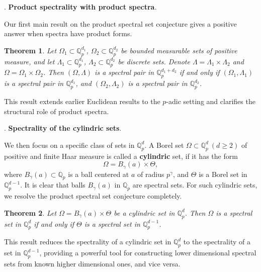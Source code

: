 \documentclass[a4paper,12pt]{amsart}
\newtheorem{theorem}{Theorem}[section]
\def\Q{\mathbb{Q}}
\def\Qp{\mathbb{Q}_p}
\begin{document}
. {\bf Product spectrality with product spectra}.

Our first main result on the product spectral set conjecture gives a positive answer when spectra have product forms.

\begin{theorem}\label{product}
Let $\Omega_1\subset\Q_p^{d_1}$, $\Omega_2\subset\Q_p^{d_2}$ be bounded  measurable sets of positive measure,
and let $\Lambda_1\subset\Q_p^{d_1}$, $\Lambda_2\subset\Q_p^{d_2}$ be  discrete sets.
Denote $\Lambda=\Lambda_1\times\Lambda_2$ and $\Omega=\Omega_1\times\Omega_2$.
Then $(\Omega,\Lambda)$ is a spectral pair in $\Q_p^{d_1+d_2}$ if and only if $(\Omega_1,\Lambda_1)$
is a spectral pair in $\Q_p^{d_1}$, and $(\Omega_2,\Lambda_2)$ is a spectral pair in $\Q_p^{d_2}$.
\end{theorem}

This result extends earlier Euclidean results \cite{Jorgensen-Pedersen1999} to the $p$-adic
setting and clarifies the structural role of product spectra.

. {\bf Spectrality of the cylindric sets}.

We then focus on a specific class of sets in $\Q_p^d$. A Borel set
 $\Omega\subset\Q_p^d \ (d\geq2)$  of positive and finite Haar measure is called
a \textbf{cylindric} set, if it has the form
 \begin{equation}
 \Omega=B_\gamma(a)\times\Theta,
\end{equation}
where $B_\gamma(a)\subset\Q_p$ is a ball centered at $a$ of radius $p^\gamma$,
and $\Theta$ is a Borel set in $\Q_p^{d-1}$. It is clear that balls $B_\gamma(a)$ in
$\Q_p$ are spectral sets.
For such cylindric sets, we resolve the product spectral set conjecture completely.
\begin{theorem}\label{main}
Let $\Omega=B_\gamma(a)\times\Theta$ be a cylindric set in $\Qp^d$. Then $\Omega$ is a {\em spectral set} in $\Qp^d$
if and only if $\Theta$ is a {\em spectral set} in $\Qp^{d-1}$.
\end{theorem}

This result reduces the spectrality of a cylindric set in $\mathbb{Q}_{p}^{d}$ to the spectrality of a set
in $\Qp^{d-1}$, providing a powerful tool for constructing lower dimensional spectral sets from
known higher dimensional ones, and vice versa.
\end{document}

